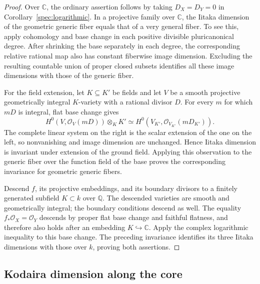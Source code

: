 \begin{proof}
Over $\mathbb C$, the ordinary assertion follows by taking
$D_X=D_Y=0$ in Corollary~\ref{spec:logarithmic}.  In a projective
family over $\mathbb C$, the Iitaka dimension of the geometric
generic fiber equals that of a very general fiber.  To see this,
apply cohomology and base change in each positive divisible
pluricanonical degree.  After shrinking the base separately in each
degree, the corresponding relative rational map also has constant
fiberwise image dimension.  Excluding the resulting countable
union of proper closed subsets identifies all these image
dimensions with those of the generic fiber.

For the field extension, let $K\subseteq K'$ be fields and let $V$
be a smooth projective geometrically integral $K$-variety with a
rational divisor $D$.  For every $m$ for which $mD$ is integral,
flat base change gives
\[
 H^0(V,\mathcal O_V(mD))\otimes_K K'
   \simeq H^0(V_{K'},\mathcal O_{V_{K'}}(mD_{K'})).
\]
The complete linear system on the right is the scalar extension of
the one on the left, so nonvanishing and image dimension are
unchanged.  Hence Iitaka dimension is invariant under extension
of the ground field.  Applying this observation to the generic
fiber over the function field of the base proves the corresponding
invariance for geometric generic fibers.

Descend $f$, its projective embeddings, and its boundary divisors
to a finitely generated subfield $K\subset k$ over $\mathbb Q$.
The descended varieties are smooth and geometrically integral;
the boundary conditions descend as well.  The equality
$f_*\mathcal O_X=\mathcal O_Y$ descends by proper flat base change
and faithful flatness, and therefore also holds after an embedding
$K\hookrightarrow\mathbb C$.  Apply the complex logarithmic
inequality to this base change.  The preceding invariance identifies
its three Iitaka dimensions with those over $k$, proving both
assertions.
\end{proof}

\subsection{Kodaira dimension along the core}
\label{spec:core}

